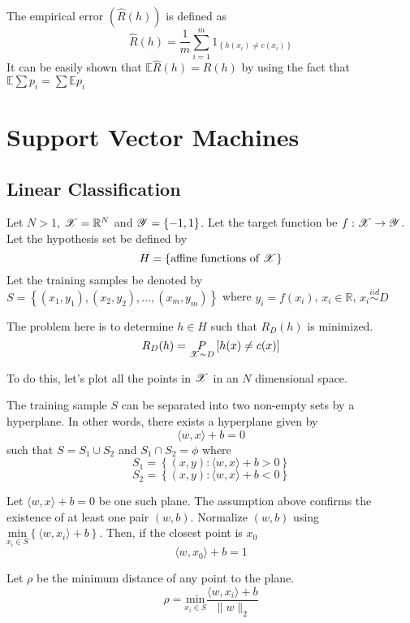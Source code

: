 \documentclass[a4paper,english,12pt]{article}
\begin{document}
\begin{defn}
The empirical error $(\hat{R}(h))$ is defined as
$$ \hat{R}(h) = \frac{1}{m} \sum_{i=1}^m 1_{ \left\{ h(x_i) \neq c(x_i) \right\} }$$
It can be easily shown that $\mathbb{E} \hat{R}(h) = R(h)$ by using the fact that $\mathbb{E} \sum p_i = \sum \mathbb{E} p_i$
\end{defn}

\section{Support Vector Machines}
\subsection{Linear Classification}

\begin{assum}
Let $N>1$, $\mathscr{X} = \mathbb{R}^N$ and $\mathscr{Y} = \{-1, 1\}$. Let the target function be $f:\mathscr{X} \rightarrow \mathscr{Y}$. Let the hypothesis set be defined by
$$ H = \left\{ \textrm{affine functions of }\mathscr{X} \right\} $$
Let the training samples be denoted by $S = \left\{ (x_1, y_1), (x_2, y_2), ... , (x_m, y_m) \right\}$ where $ y_i = f(x_i)$, $x_i \in \mathbb{R}$, $x_i \overset{iid} \sim D$

\end{assum}

The problem here is to determine $h \in H$ such that $R_D (h)$ is minimized.
$$ R_D (h) = \underset{\mathscr{X} \sim D} P \left[ h(x) \neq c(x) \right] $$

To do this, let's plot all the points in $\mathscr{X}$ in an $N$ dimensional space.

\begin{assum}
The training sample $S$ can be separated into two non-empty sets by a hyperplane. In other words, there exists a hyperplane given by
$$ \langle w,x \rangle + b = 0 $$
such that $S=S_1 \cup S_2$ and $S_1 \cap S_2 = \phi$ where
$$S_1 = \left\{ (x,y): \langle w,x \rangle +b > 0  \right\}$$
$$S_2 = \left\{ (x,y): \langle w,x \rangle +b < 0  \right\}$$

\end{assum}

Let $\langle w,x \rangle + b = 0$ be one such plane. The assumption above confirms the existence of at least one pair $(w,b)$. Normalize $(w,b)$ using $\underset{x_i \in S} {\mathrm{min}} \left\{ \langle w,x_i \rangle + b \right\}$. Then, if the closest point is $x_0$
$$ \langle w,x_0 \rangle + b = 1 $$

Let $\rho$ be the minimum distance of any point to the plane.
$$ \rho = \underset{x_i \in S} {\mathrm{min}} \frac{\langle w,x_i \rangle + b}{\| w \|_2} $$
\end{document}
